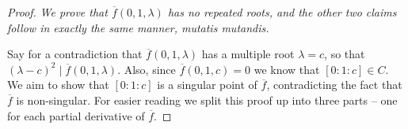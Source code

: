 \documentclass[10pt,notitlepage]{article}
\numberwithin{equation}{subsection}
\newcommand{\cover}[1]{\overline{#1}}
\begin{document}
            \begin{proof}
                \emph{We prove that $\cover{f}(0,1,\lambda)$ has no repeated roots, and the other two claims follow in exactly the same manner, mutatis mutandis.}

                \bigskip

                Say for a contradiction that $\cover{f}(0,1,\lambda)$ has a multiple root $\lambda=c$, so that $(\lambda-c)^2\mid\cover{f}(0,1,\lambda)$.
                Also, since $\cover{f}(0,1,c)=0$ we know that $[0:1:c]\in C$.
                We aim to show that $[0:1:c]$ is a singular point of $\cover{f}$, contradicting the fact that $\cover{f}$ is non-singular.
                For easier reading we split this proof up into three parts -- one for each partial derivative of $\cover{f}$.


\end{proof}
\end{document}
